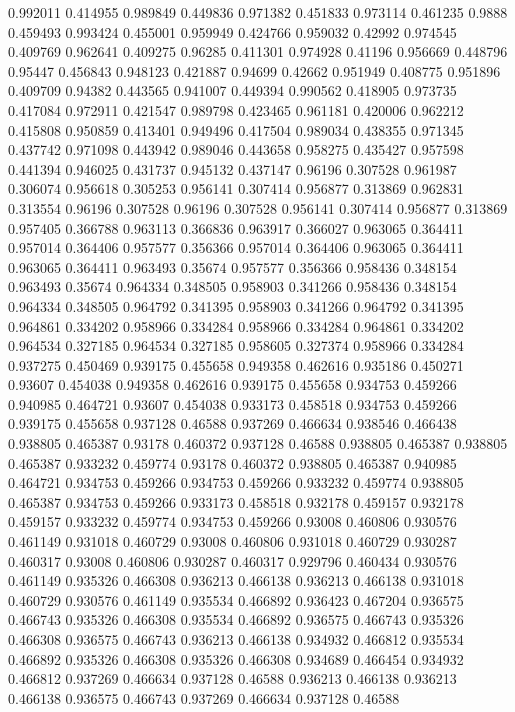0.992011 0.414955
0.989849 0.449836
0.971382 0.451833
0.973114 0.461235
0.9888 0.459493
0.993424 0.455001
0.959949 0.424766
0.959032 0.42992
0.974545 0.409769
0.962641 0.409275
0.96285 0.411301
0.974928 0.41196
0.956669 0.448796
0.95447 0.456843
0.948123 0.421887
0.94699 0.42662
0.951949 0.408775
0.951896 0.409709
0.94382 0.443565
0.941007 0.449394
0.990562 0.418905
0.973735 0.417084
0.972911 0.421547
0.989798 0.423465
0.961181 0.420006
0.962212 0.415808
0.950859 0.413401
0.949496 0.417504
0.989034 0.438355
0.971345 0.437742
0.971098 0.443942
0.989046 0.443658
0.958275 0.435427
0.957598 0.441394
0.946025 0.431737
0.945132 0.437147
0.96196 0.307528
0.961987 0.306074
0.956618 0.305253
0.956141 0.307414
0.956877 0.313869
0.962831 0.313554
0.96196 0.307528
0.96196 0.307528
0.956141 0.307414
0.956877 0.313869
0.957405 0.366788
0.963113 0.366836
0.963917 0.366027
0.963065 0.364411
0.957014 0.364406
0.957577 0.356366
0.957014 0.364406
0.963065 0.364411
0.963065 0.364411
0.963493 0.35674
0.957577 0.356366
0.958436 0.348154
0.963493 0.35674
0.964334 0.348505
0.958903 0.341266
0.958436 0.348154
0.964334 0.348505
0.964792 0.341395
0.958903 0.341266
0.964792 0.341395
0.964861 0.334202
0.958966 0.334284
0.958966 0.334284
0.964861 0.334202
0.964534 0.327185
0.964534 0.327185
0.958605 0.327374
0.958966 0.334284
0.937275 0.450469
0.939175 0.455658
0.949358 0.462616
0.935186 0.450271
0.93607 0.454038
0.949358 0.462616
0.939175 0.455658
0.934753 0.459266
0.940985 0.464721
0.93607 0.454038
0.933173 0.458518
0.934753 0.459266
0.939175 0.455658
0.937128 0.46588
0.937269 0.466634
0.938546 0.466438
0.938805 0.465387
0.93178 0.460372
0.937128 0.46588
0.938805 0.465387
0.938805 0.465387
0.933232 0.459774
0.93178 0.460372
0.938805 0.465387
0.940985 0.464721
0.934753 0.459266
0.934753 0.459266
0.933232 0.459774
0.938805 0.465387
0.934753 0.459266
0.933173 0.458518
0.932178 0.459157
0.932178 0.459157
0.933232 0.459774
0.934753 0.459266
0.93008 0.460806
0.930576 0.461149
0.931018 0.460729
0.93008 0.460806
0.931018 0.460729
0.930287 0.460317
0.93008 0.460806
0.930287 0.460317
0.929796 0.460434
0.930576 0.461149
0.935326 0.466308
0.936213 0.466138
0.936213 0.466138
0.931018 0.460729
0.930576 0.461149
0.935534 0.466892
0.936423 0.467204
0.936575 0.466743
0.935326 0.466308
0.935534 0.466892
0.936575 0.466743
0.935326 0.466308
0.936575 0.466743
0.936213 0.466138
0.934932 0.466812
0.935534 0.466892
0.935326 0.466308
0.935326 0.466308
0.934689 0.466454
0.934932 0.466812
0.937269 0.466634
0.937128 0.46588
0.936213 0.466138
0.936213 0.466138
0.936575 0.466743
0.937269 0.466634
0.937128 0.46588
